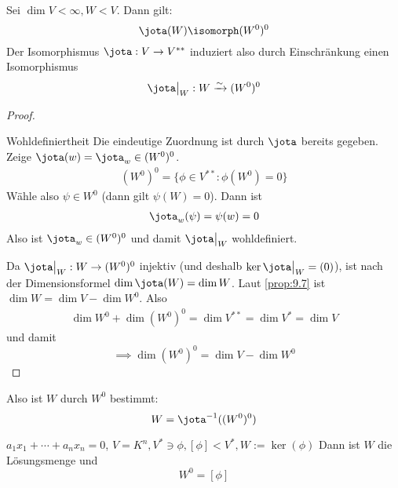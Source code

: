 \documentclass[a4paper, 10pt]{scrbook}
\begin{document}
\begin{kor}
\label{kor:9.8}
Sei $\dim V<\infty, W<V$. Dann gilt:
\[
\jota(W)\isomorph(W^0)^0
\]
Der Isomorphismus $\jota: V\to V^{**}$ induziert also durch Einschränkung einen Isomorphismus
\[
	\jota\big|_W: W\xrightarrow{\sim} (W^0)^0
\]
\begin{proof}
	\begin{seg}{Wohldefiniertheit}
		Die eindeutige Zuordnung ist durch $\jota$ bereits gegeben.
		Zeige $\jota(w)=\jota_w\in(W^0)^0$.
\begin{align*}
(W^0)^0=\{\phi\in V^{**}:\phi(W^0)=0\}
\end{align*}
Wähle also $\psi\in W^0$ (dann gilt $\psi(W)=0$).
Dann ist
\begin{align*}
\jota_w(\psi)=\psi(w)=0
\end{align*}
Also ist $\jota_w\in (W^0)^0$ und damit $\jota\big|_W$ wohldefiniert.
\end{seg}

Da $\jota\big|_W:W\to (W^{0})^0$ injektiv (und deshalb $\ker\jota\big|_W=(0)$), ist nach der Dimensionsformel $\dim\jota(W) = \dim W$.
Laut \ref{prop:9.7} ist $\dim W=\dim V-\dim W^0$.
Also
\begin{align*}
\dim W^0 + \dim (W^0)^0 = \dim V^{**} = \dim V^* = \dim V
\end{align*}
und damit
\[
\implies \dim(W^0)^0=\dim V- \dim W^0
\]
\end{proof}
\begin{note}
Also ist $W$ durch $W^0$ bestimmt:
\[
W=\jota^{-1}((W^0)^0)
\]
\end{note}
\end{kor}


\begin{ex}
$a_1x_1+\dotsb+a_nx_n=0$, $V=K^n, V^*\ni \phi, [\phi]<V^*, W:=\ker(\phi)$ %
Dann ist $W$ die Lösungsmenge und
\[
W^0=[\phi]
\]
\end{ex}
\end{document}
